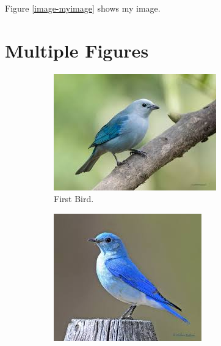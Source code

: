 \documentclass[a4paper,12pt]{article}
\begin{document}
{Figure \ref{image-myimage} shows my image.


\section{Multiple Figures}
\begin{figure}[h!]
\centering
\begin{subfigure}[b]{0.2\linewidth}
\includegraphics[width=\linewidth]{bird}
\caption{First Bird.}
\end{subfigure}
\begin{subfigure}[b]{0.2\linewidth}
\includegraphics[width=\linewidth]{bird3}

\end{subfigure}
\end{figure}}
\end{document}
